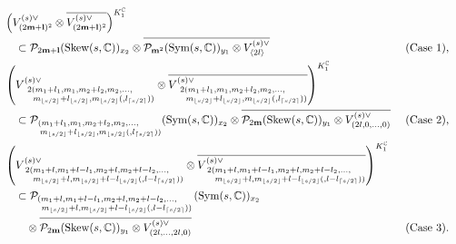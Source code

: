 \documentclass[pdftex]{sigma}
\numberwithin{equation}{section}
\newcommand{\bl}{\mathbf{l}}
\newcommand{\bm}{\mathbf{m}}
\newcommand{\BC}{\mathbb{C}}
\newcommand{\cP}{\mathcal{P}}
\newcommand{\Sym}{\operatorname{Sym}}
\newcommand{\Skew}{\operatorname{Skew}}
\begin{document}
\begin{alignat*}{3}
&\left(V_{(2\bm+\bl)^2}^{(s)\vee}\otimes \overline{V_{(2\bm+\bl)^2}^{(s)\vee}}\right)^{K_1^\BC}&&&\\
&\quad {} \subset \cP_{2\bm+\bl}(\Skew(s,\BC))_{x_2}\otimes\overline{\cP_{\bm^2}(\Sym(s,\BC))_{y_1}\otimes V_{\langle 2l\rangle}^{(s)\vee}}
& &(\text{Case }1),& \\
&\left(V_{\substack{2(m_1+l_1,m_1,m_2+l_2,m_2,\ldots,\hspace{15pt}\\ \quad m_{\lfloor s/2\rfloor}+l_{\lfloor s/2\rfloor},m_{\lfloor s/2\rfloor}
(,l_{\lceil s/2\rceil}))}}^{(s)\vee}\otimes \overline{
V_{\substack{2(m_1+l_1,m_1,m_2+l_2,m_2,\ldots,\hspace{15pt}\\ \quad m_{\lfloor s/2\rfloor}+l_{\lfloor s/2\rfloor},m_{\lfloor s/2\rfloor}
(,l_{\lceil s/2\rceil}))}}^{(s)\vee}}\right)^{K_1^\BC}&&&\\
&\quad{} \subset\cP_{\substack{(m_1+l_1,m_1,m_2+l_2,m_2,\ldots,\hspace{20pt}\\ \; m_{\lfloor s/2\rfloor}+l_{\lfloor s/2\rfloor},m_{\lfloor s/2\rfloor}
(,l_{\lceil s/2\rceil}))}}(\Sym(s,\BC))_{x_2}
\otimes\overline{\cP_{2\bm}(\Skew(s,\BC))_{y_1}\otimes V_{(2l,0,\ldots,0)}^{(s)\vee}}\ && (\text{Case }2),&\\
&\left(V_{\substack{2(m_1+l,m_1+l-l_1,m_2+l,m_2+l-l_2,\ldots,\hspace{10pt}\\ \quad
m_{\lfloor s/2\rfloor}+l,m_{\lfloor s/2\rfloor}+l-l_{\lfloor s/2\rfloor}(,l-l_{\lceil s/2\rceil}))}}^{(s)\vee}\otimes\overline{
V_{\substack{2(m_1+l,m_1+l-l_1,m_2+l,m_2+l-l_2,\ldots,\hspace{10pt}\\ \quad
m_{\lfloor s/2\rfloor}+l,m_{\lfloor s/2\rfloor}+l-l_{\lfloor s/2\rfloor}(,l-l_{\lceil s/2\rceil}))}}^{(s)\vee}}\right)^{K_1^\BC}\hspace{-30pt} &&&\\
&\quad {} \subset \cP_{\substack{(m_1+l,m_1+l-l_1,m_2+l,m_2+l-l_2,\ldots,\hspace{15pt}\\ \;
m_{\lfloor s/2\rfloor}+l,m_{\lfloor s/2\rfloor}+l-l_{\lfloor s/2\rfloor}(,l-l_{\lceil s/2\rceil}))}}(\Sym(s,\BC))_{x_2}&&&\\
& \quad\quad {} \otimes\overline{\cP_{2\bm}(\Skew(s,\BC))_{y_1}\otimes V_{(2l,\ldots,2l,0)}^{(s)\vee}} && (\text{Case }3).&
\end{alignat*}
\end{document}
